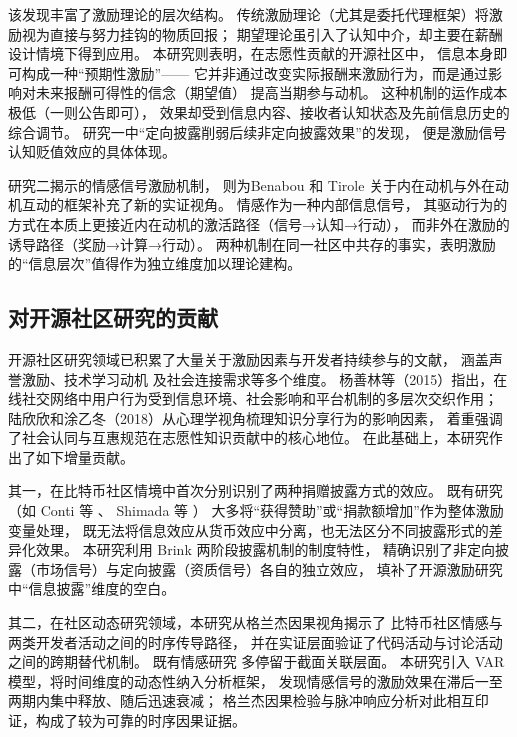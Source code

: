 该发现丰富了激励理论的层次结构。
传统激励理论（尤其是委托代理框架）将激励视为直接与努力挂钩的物质回报；
期望理论虽引入了认知中介，却主要在薪酬设计情境下得到应用。
本研究则表明，在志愿性贡献的开源社区中，
信息本身即可构成一种“预期性激励”——
它并非通过改变实际报酬来激励行为，而是通过影响对未来报酬可得性的信念（期望值）
提高当期参与动机\cite{vroom1964work}。
这种机制的运作成本极低（一则公告即可），
效果却受到信息内容、接收者认知状态及先前信息历史的综合调节。
研究一中“定向披露削弱后续非定向披露效果”的发现，
便是激励信号认知贬值效应的具体体现\cite{oliver1980cognitive}。

研究二揭示的情感信号激励机制，
则为Benabou 和 Tirole \citeyear{benabou2003intrinsic}
关于内在动机与外在动机互动的框架补充了新的实证视角。
情感作为一种内部信息信号，
其驱动行为的方式在本质上更接近内在动机的激活路径（信号→认知→行动），
而非外在激励的诱导路径（奖励→计算→行动）。
两种机制在同一社区中共存的事实，表明激励的“信息层次”值得作为独立维度加以理论建构。

\subsection{对开源社区研究的贡献}

开源社区研究领域已积累了大量关于激励因素与开发者持续参与的文献，
涵盖声誉激励\cite{lerner2002simple}、技术学习动机\cite{fang2009understanding}
及社会连接需求\cite{yang2021differential}等多个维度。
杨善林等（2015）指出，在线社交网络中用户行为受到信息环境、社会影响和平台机制的多层次交织作用\cite{yang2015social}；
陆欣欣和涂乙冬（2018）从心理学视角梳理知识分享行为的影响因素，
着重强调了社会认同与互惠规范在志愿性知识贡献中的核心地位\cite{lu2018sharing}。
在此基础上，本研究作出了如下增量贡献。

其一，在比特币社区情境中首次分别识别了两种捐赠披露方式的效应。
既有研究（如 Conti 等 \citeyear{conti2023incentivizing}、
Shimada 等 \citeyear{shimada2022github}）
大多将“获得赞助”或“捐款额增加”作为整体激励变量处理，
既无法将信息效应从货币效应中分离，也无法区分不同披露形式的差异化效果。
本研究利用 Brink 两阶段披露机制的制度特性，
精确识别了非定向披露（市场信号）与定向披露（资质信号）各自的独立效应，
填补了开源激励研究中“信息披露”维度的空白。

其二，在社区动态研究领域，本研究从格兰杰因果视角揭示了
比特币社区情感与两类开发者活动之间的时序传导路径，
并在实证层面验证了代码活动与讨论活动之间的跨期替代机制。
既有情感研究\cite{guzzi2013,yang2021differential,zhang2024ugc}
多停留于截面关联层面。
本研究引入 VAR 模型，将时间维度的动态性纳入分析框架，
发现情感信号的激励效果在滞后一至两期内集中释放、随后迅速衰减；
格兰杰因果检验与脉冲响应分析对此相互印证，构成了较为可靠的时序因果证据。

